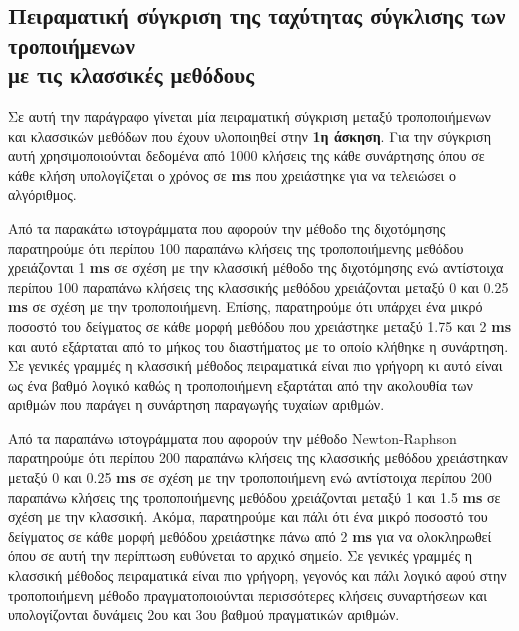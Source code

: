\documentclass[First Project.tex]{subfiles}
\begin{document}
\subsection{Πειραματική σύγκριση της ταχύτητας σύγκλισης των τροποιήμενων \\ με τις κλασσικές μεθόδους}

Σε αυτή την παράγραφο γίνεται μία πειραματική σύγκριση μεταξύ τροποποιήμενων και κλασσικών μεθόδων που έχουν υλοποιηθεί στην 
\textbf{1η άσκηση}. Για την σύγκριση αυτή χρησιμοποιούνται δεδομένα από 1000 κλήσεις της κάθε συνάρτησης όπου σε κάθε κλήση υπολογίζεται ο 
χρόνος σε \textlatin{\textbf{ms}} που χρειάστηκε για να τελειώσει ο αλγόριθμος.
\vspace{5mm}
\begin{figure}[h!]
    \centering
    \quad
\end{figure}

Από τα παρακάτω ιστογράμματα που αφορούν την μέθοδο της διχοτόμησης παρατηρούμε ότι περίπου 100 παραπάνω κλήσεις της τροποποιήμενης
μεθόδου χρειάζονται 1 \textlatin{\textbf{ms}} σε σχέση με την κλασσική μέθοδο της διχοτόμησης ενώ αντίστοιχα περίπου 100 παραπάνω κλήσεις 
της κλασσικής μεθόδου χρειάζονται μεταξύ 0 και 0.25 \textlatin{\textbf{ms}} σε σχέση με την τροποποιήμενη. Επίσης, παρατηρούμε ότι υπάρχει
ένα μικρό ποσοστό του δείγματος σε κάθε μορφή μεθόδου που χρειάστηκε μεταξύ 1.75 και 2 \textlatin{\textbf{ms}} και αυτό εξάρταται από το μήκος
του διαστήματος με το οποίο κλήθηκε η συνάρτηση. Σε γενικές γραμμές η κλασσική μέθοδος πειραματικά είναι πιο γρήγορη κι αυτό είναι ως ένα
βαθμό λογικό καθώς η τροποποιήμενη εξαρτάται από την ακολουθία των αριθμών που παράγει η συνάρτηση παραγωγής τυχαίων αριθμών.

\vspace{5mm}
\begin{figure}[h!]
    \centering
    \quad
\end{figure}

Από τα παραπάνω ιστογράμματα που αφορούν την μέθοδο \textlatin{Newton-Raphson} παρατηρούμε ότι περίπου 200 παραπάνω κλήσεις της κλασσικής
μεθόδου χρειάστηκαν μεταξύ 0 και 0.25 \textlatin{\textbf{ms}} σε σχέση με την τροποποιήμενη ενώ αντίστοιχα περίπου 200 παραπάνω κλήσεις
της τροποποιήμενης μεθόδου χρειάζονται μεταξύ 1 και 1.5 \textlatin{\textbf{ms}} σε σχέση με την κλασσική. Ακόμα, παρατηρούμε και πάλι ότι
ένα μικρό ποσοστό του δείγματος σε κάθε μορφή μεθόδου χρειάστηκε πάνω από 2 \textlatin{\textbf{ms}} για να ολοκληρωθεί όπου σε αυτή την 
περίπτωση ευθύνεται το αρχικό σημείο. Σε γενικές γραμμές η κλασσική μέθοδος πειραματικά είναι πιο γρήγορη, γεγονός και πάλι λογικό αφού στην
τροποποιήμενη μέθοδο πραγματοποιούνται περισσότερες κλήσεις συναρτήσεων και υπολογίζονται δυνάμεις 2ου και 3ου βαθμού πραγματικών αριθμών.
\end{document}
